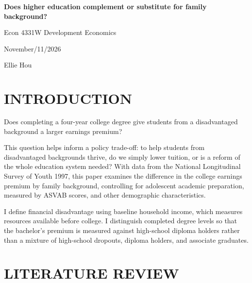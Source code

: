 \documentclass[12pt,letterpaper]{article}
\begin{document}
\hypersetup{pageanchor=false}
\begin{titlepage}
    \centering
    \singlespacing
    \vspace*{1.5in}

    {\bfseries Does higher education complement or substitute for family background?\par}
    \vspace{\baselineskip}
    Econ 4331W Development Economics\par
    November/11/2026\par
    Ellie Hou\par

    \vfill
\end{titlepage}
\hypersetup{pageanchor=true}

\doublespacing
\raggedright

\section*{INTRODUCTION}
Does completing a four-year college degree give students from a disadvantaged background a
larger earnings premium? 


This question helps inform a policy trade-off: to help students from
disadvantaged backgrounds thrive, do we simply lower tuition, or is a reform of the whole
education system needed? With data from the National Longitudinal Survey of Youth 1997,
this paper examines the difference in the college earnings premium by family background,
controlling for adolescent academic preparation, measured by ASVAB scores, and other
demographic characteristics.

I define financial disadvantage using baseline household income, which measures
resources available before college. I distinguish completed degree levels so that
the bachelor's premium is measured against high-school diploma holders rather
than a mixture of high-school dropouts, diploma holders, and associate graduates.


\section*{LITERATURE REVIEW}
\end{document}
